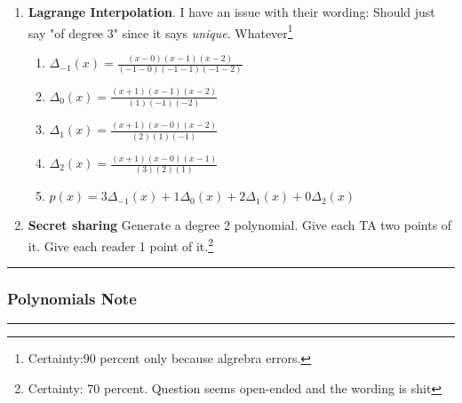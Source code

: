 \documentclass[12pt]{article}
\newcommand{\myspace}{\vspace{2\bigskipamount}}
\begin{document}
\begin{small}
\begin{enumerate}
\begin{enumerate}
	\end{enumerate}
	\item \textbf{Lagrange Interpolation}. I have an issue with their wording: Should just say "of degree 3" since it says \emph{unique}. Whatever\footnote{Certainty:90 percent only because algrebra errors.}
	\begin{enumerate}
		\item $ \Delta_{-1}(x) = \tfrac{(x-0)(x-1)(x-2)}{(-1-0)(-1-1)(-1-2)}$
		\item $ \Delta_{0}(x) = \frac{(x+1)(x-1)(x-2)}{(1)(-1)(-2)}$
		\item $ \Delta_{1}(x) = \frac{(x+1)(x-0)(x-2)}{(2)(1)(-1)}$
		\item $ \Delta_{2}(x) = \frac{(x+1)(x-0)(x-1)}{(3)(2)(1)}$
		\item $p(x) = 3 \Delta_{-1}(x) + 1 \Delta_{0}(x) + 2\Delta_{1}(x) + 0 \Delta_{2}(x)$
	\end{enumerate}
	
	\item \textbf{Secret sharing} Generate a degree 2 polynomial. Give each TA two points of it. Give each reader 1 point of it.\footnote{Certainty: 70 percent. Question seems open-ended and the wording is shit}
\end{enumerate}
\end{small}


\myspace
{}
\hrule
\subsubsection{Polynomials Note}
\hrule
\end{document}
